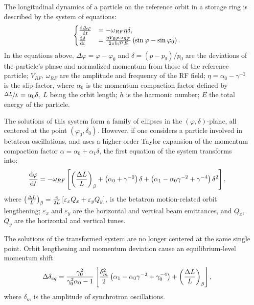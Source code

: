 \documentclass[a4paper]{jacow}
\newcommand{\w}{\omega}
\newcommand{\D}{\Delta}
\begin{document}
The longitudinal dynamics of a particle on the reference orbit in a storage ring is described by
the system of equations:
\begin{equation}
  \begin{cases}
    \ddt{\D\varphi} &= -\w_{RF}\eta\delta, \\
    \ddt{\delta} &= \frac{q V_{RF}\w_{RF}}{2\pi h\beta^2E}\bkt{\sin\varphi - \sin\varphi_0}.
  \end{cases}
\end{equation}
In the equations above, $\D\varphi = \varphi-\varphi_0$ and  $\delta = (p-p_0)/p_0$ are the deviations
of the particle's phase and normalized momentum from those of the reference particle;
$V_{RF}$, $\w_{RF}$ are the amplitude and frequency of the RF field;
$\eta = \alpha_0 - \gamma^{-2}$ is the slip-factor, where $\alpha_0$ is
the momentum compaction factor defined by $\sfrac{\Delta L}{L} = \alpha_0\delta$, $L$ being the orbit length;
$h$ is the harmonic number; $E$ the total energy of the particle.

The solutions of this system form a family of ellipses in the $(\varphi, \delta)$-plane, all centered at the point
$(\varphi_0,\delta_0)$. However, if one considers a particle involved in betatron oscillations, and uses a
higher-order Taylor expansion of the momentum compaction factor $\alpha = \alpha_0 + \alpha_1\delta$,
the first equation of the system transforms into:~\cite[p.~2579]{Senichev:IPAC13-WEPEA036}
\[
\ddt{\varphi} = -\w_{RF} \bkt*{\bkt{\frac{\Delta L}{L}}_\beta + \bkt{\alpha_0 + \gamma^{-2}}\delta + \bkt{\alpha_1 - \alpha_0\gamma^{-2} + \gamma^{-4}}\delta^2},
\]
where $\bkt{\frac{\Delta L}{L}}_\beta = \frac{\pi}{2L}\bkt*{\varepsilon_xQ_x + \varepsilon_yQ_y}$, is
the betatron motion-related orbit lengthening; $\varepsilon_x$ and $\varepsilon_y$ are the
horizontal and vertical beam emittances, and $Q_x$, $Q_y$ are the horizontal and vertical tunes.

The solutions of the transformed system are no longer centered at the same single point.
Orbit lengthening and momentum deviation cause an equilibrium-level momentum shift~\cite[p.~2581]{Senichev:IPAC13-WEPEA036}
\begin{equation}\label{eq:EquLevMom_shift}
\Delta\delta_{eq} = \frac{\gamma_0^2}{\gamma_0^2\alpha_0 - 1}\bkt*{\frac{\delta_m^2}{2}\bkt{\alpha_1 - \alpha_0\gamma^{-2} + \gamma_0^{-4}} + \bkt{\frac{\Delta L}{L}}_\beta},
\end{equation}
where $\delta_m$ is the amplitude of synchrotron oscillations.
\end{document}
